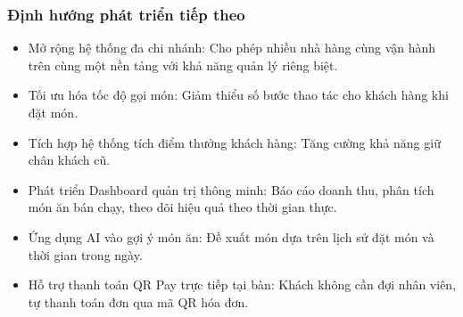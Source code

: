 \documentclass[a4paper]{article}
\begin{document}
\subsubsection{Định hướng phát triển tiếp theo}
\begin{itemize}
    \item Mở rộng hệ thống đa chi nhánh: Cho phép nhiều nhà hàng cùng vận hành trên cùng một nền tảng với khả năng quản lý riêng biệt.
    \item Tối ưu hóa tốc độ gọi món: Giảm thiểu số bước thao tác cho khách hàng khi đặt món.
    \item Tích hợp hệ thống tích điểm thưởng khách hàng: Tăng cường khả năng giữ chân khách cũ.
    \item Phát triển Dashboard quản trị thông minh: Báo cáo doanh thu, phân tích món ăn bán chạy, theo dõi hiệu quả theo thời gian thực.
    \item Ứng dụng AI vào gợi ý món ăn: Đề xuất món dựa trên lịch sử đặt món và thời gian trong ngày.
    \item Hỗ trợ thanh toán QR Pay trực tiếp tại bàn: Khách không cần đợi nhân viên, tự thanh toán đơn qua mã QR hóa đơn.
\end{itemize}
\end{document}
